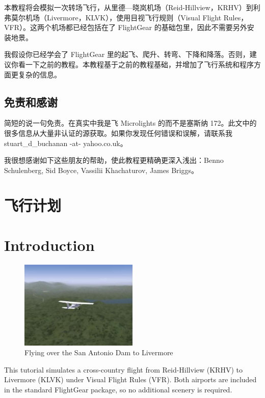 本教程将会模拟一次转场飞行，从里德—晓岚机场（Reid-Hillview，KRHV）到利弗莫尔机场（Livermore，KLVK），使用目视飞行规则（Visual Flight Rules，VFR）。这两个机场都已经包括在了 FlightGear 的基础包里，因此不需要另外安装地景。

我假设你已经学会了 FlightGear 里的起飞、爬升、转弯、下降和降落。否则，建议你看一下之前的教程。本教程基于之前的教程基础，并增加了飞行系统和程序方面更复杂的信息。

\subsection{免责和感谢}

简短的说一句免责。在真实中我是飞 Microlights 的而不是塞斯纳 172。此文中的很多信息从大量非认证的源获取。如果你发现任何错误和误解，请联系我 stuart\_d\_buchanan -at- yahoo.co.uk。

我很想感谢如下这些朋友的帮助，使此教程更精确更深入浅出：Benno Schulenberg, Sid Boyce, Vassilii Khachaturov, James Briggs。

\section{飞行计划}



\iffalse
\section{Introduction}

\begin{figure}[!htp]
\centering
\includegraphics[width=0.5\textwidth]{antonio2}
\caption{Flying over the San Antonio Dam to Livermore}
\end{figure}

This tutorial simulates a cross-country flight from Reid-Hillview (KRHV) to
Livermore (KLVK) under Visual Flight Rules (VFR). Both airports are
included in the standard FlightGear package, so no additional scenery is required.

